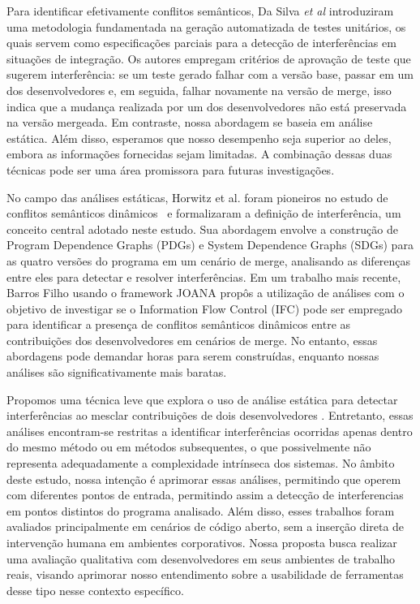 \documentclass[sigconf,review]{acmart}
\begin{document}
Para identificar efetivamente conflitos semânticos, Da Silva \emph{et al} \cite{silva2022detecting} introduziram uma metodologia fundamentada na geração automatizada de testes unitários, os quais servem como especificações parciais para a detecção de interferências em situações de integração. Os autores empregam critérios de aprovação de teste que sugerem interferência: se um teste gerado falhar com a versão base, passar em um dos desenvolvedores e, em seguida, falhar novamente na versão de merge, isso indica que a mudança realizada por um dos desenvolvedores não está preservada na versão mergeada. Em contraste, nossa abordagem se baseia em análise estática. Além disso, esperamos que nosso desempenho seja superior ao deles, embora as informações fornecidas sejam limitadas. A combinação dessas duas técnicas pode ser uma área promissora para futuras investigações.


No campo das análises estáticas, Horwitz et al. foram pioneiros no estudo de conflitos semânticos dinâmicos~\cite{Horwitz1989IntegratingNV,horwitz1990interprocedural,yang1992program} e formalizaram a definição de interferência, um conceito central adotado neste estudo. Sua abordagem envolve a construção de Program Dependence Graphs (PDGs)\cite{Horwitz1989IntegratingNV} e System Dependence Graphs (SDGs)\cite{horwitz1990interprocedural} para as quatro versões do programa em um cenário de merge, analisando as diferenças entre eles para detectar e resolver interferências.
Em um trabalho mais recente, Barros Filho \cite{barros2017using}  usando o framework JOANA\cite{joana-paper} propôs a utilização de análises com o objetivo de investigar se o Information Flow Control (IFC) pode ser empregado para identificar a presença de conflitos semânticos dinâmicos entre as contribuições dos desenvolvedores em cenários de merge. No entanto, essas abordagens pode demandar horas para serem construídas, enquanto nossas análises são significativamente mais baratas. 


Propomos uma técnica leve que explora o uso de análise estática para detectar interferências ao mesclar contribuições de dois desenvolvedores \cite{galileu}. Entretanto, essas análises encontram-se restritas a identificar interferências ocorridas apenas dentro do mesmo método ou em métodos subsequentes, o que possivelmente não representa adequadamente a complexidade intrínseca dos sistemas. No âmbito deste estudo, nossa intenção é aprimorar essas análises, permitindo que operem com diferentes pontos de entrada, permitindo assim a detecção de interferencias em pontos distintos do programa analisado. Além disso, esses trabalhos foram avaliados principalmente em cenários de código aberto, sem a inserção direta de intervenção humana em ambientes corporativos. Nossa proposta busca realizar uma avaliação qualitativa com desenvolvedores em seus ambientes de trabalho reais, visando aprimorar nosso entendimento sobre a usabilidade de ferramentas desse tipo nesse contexto específico.
\end{document}
